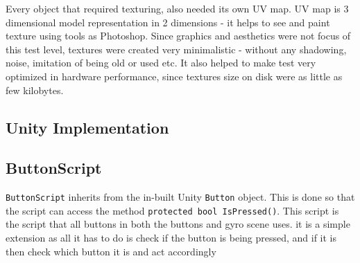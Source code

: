 Every object that required texturing, also needed its own UV map. UV map is 3 dimensional model representation in 2 dimensions - it helps to see and paint texture using tools as Photoshop. Since graphics and aesthetics were not focus of this test level, textures were created very minimalistic - without any shadowing, noise, imitation of being old or used etc. It also helped to make test very optimized in hardware performance, since textures size on disk were as little as few kilobytes. 
\subsection{Unity Implementation}
\subsection{ButtonScript}
{\tt ButtonScript} inherits from the in-built Unity {\tt Button} object. This is done so that the script can access the method {\tt   protected bool IsPressed()}. This script is the script that all buttons in both the buttons and gyro scene uses. it is a simple extension as all it has to do is check if the button is being pressed, and if it is then check which button it is and act accordingly
